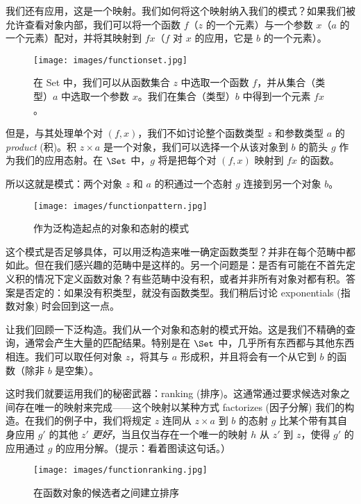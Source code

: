 我们还有应用，这是一个映射。我们如何将这个映射纳入我们的模式？如果我们被允许查看对象内部，我们可以将一个函数 $f$（$z$ 的一个元素）与一个参数 $x$（$a$ 的一个元素）配对，并将其映射到 $f x$（$f$ 对 $x$ 的应用，它是 $b$ 的一个元素）。

\begin{figure}[H]
  \centering\texttt{[image: images/functionset.jpg]}
  \caption{在 Set 中，我们可以从函数集合 $z$ 中选取一个函数 $f$，并从集合（类型）$a$ 中选取一个参数 $x$。我们在集合（类型）$b$ 中得到一个元素 $f x$。}
\end{figure}

\noindent
但是，与其处理单个对 $(f, x)$，我们不如讨论整个函数类型 $z$ 和参数类型 $a$ 的 \emph{product} (积)。积 $z\times{}a$ 是一个对象，我们可以选择一个从该对象到 $b$ 的箭头 $g$ 作为我们的应用态射。在 $\Set$ 中，$g$ 将是把每个对 $(f, x)$ 映射到 $f x$ 的函数。

所以这就是模式：两个对象 $z$ 和 $a$ 的积通过一个态射 $g$ 连接到另一个对象 $b$。

\begin{figure}[H]
  \centering
  \texttt{[image: images/functionpattern.jpg]}
  \caption{作为泛构造起点的对象和态射的模式}
\end{figure}

\noindent
这个模式是否足够具体，可以用泛构造来唯一确定函数类型？并非在每个范畴中都如此。但在我们感兴趣的范畴中是这样的。另一个问题是：是否有可能在不首先定义积的情况下定义函数对象？有些范畴中没有积，或者并非所有对象对都有积。答案是否定的：如果没有积类型，就没有函数类型。我们稍后讨论 exponentials (指数对象) 时会回到这一点。

让我们回顾一下泛构造。我们从一个对象和态射的模式开始。这是我们不精确的查询，通常会产生大量的匹配结果。特别是在 $\Set$ 中，几乎所有东西都与其他东西相连。我们可以取任何对象 $z$，将其与 $a$ 形成积，并且将会有一个从它到 $b$ 的函数（除非 $b$ 是空集）。

这时我们就要运用我们的秘密武器：ranking (排序)。这通常通过要求候选对象之间存在唯一的映射来完成——这个映射以某种方式 factorizes (因子分解) 我们的构造。在我们的例子中，我们将规定 $z$ 连同从 $z \times a$ 到 $b$ 的态射 $g$ 比某个带有其自身应用 $g'$ 的其他 $z'$ \emph{更好}，当且仅当存在一个唯一的映射 $h$ 从 $z'$ 到 $z$，使得 $g'$ 的应用通过 $g$ 的应用分解。（提示：看着图读这句话。）

\begin{figure}[H]
  \centering
  \texttt{[image: images/functionranking.jpg]}
  \caption{在函数对象的候选者之间建立排序}
\end{figure}

